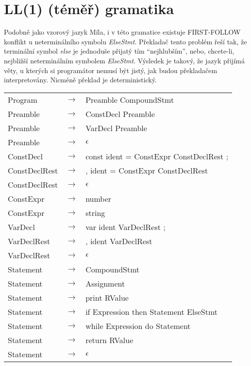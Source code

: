 \documentclass[10pt,a4paper]{article}
\begin{document}
\section{LL(1) (téměř) gramatika}

Podobně jako vzorový jazyk Míla, i v této gramatice existuje FIRST-FOLLOW
konflikt u neterminálního symbolu \textit{ElseStmt}. Překladač tento problém
řeší tak, že terminální symbol \textit{else} je jednoduše přijatý tím
``nejhlubším'', nebo, chcete-li, nejbližší neterminálním symbolem
\textit{ElseStmt}. Výsledek je takový, že jazyk přijímá věty, u kterých si
programátor nemusí být jistý, jak budou překladačem interpretovány. Nicméně
překlad je deterministický.

\begin{longtable}{ l c l }
	Program          & $\rightarrow$ & Preamble CompoundStmt \\
	
	Preamble         & $\rightarrow$ & ConstDecl Preamble \\
	Preamble         & $\rightarrow$ & VarDecl Preamble \\
	Preamble         & $\rightarrow$ & $\epsilon$ \\
	
	ConstDecl        & $\rightarrow$ & const ident = ConstExpr ConstDeclRest ; \\
	
	ConstDeclRest    & $\rightarrow$ & , ident = ConstExpr ConstDeclRest \\
	ConstDeclRest    & $\rightarrow$ & $\epsilon$ \\
	
	ConstExpr        & $\rightarrow$ & number \\
	ConstExpr        & $\rightarrow$ & string \\

	VarDecl          & $\rightarrow$ & var ident VarDeclRest ; \\
	
	VarDeclRest      & $\rightarrow$ & , ident VarDeclRest \\
	VarDeclRest      & $\rightarrow$ & $\epsilon$ \\

	Statement        & $\rightarrow$ & CompoundStmt \\
	Statement        & $\rightarrow$ & Assignment \\
	Statement        & $\rightarrow$ & print RValue \\
	Statement        & $\rightarrow$ & if Expression then Statement ElseStmt \\
	Statement        & $\rightarrow$ & while Expression do Statement \\
	Statement        & $\rightarrow$ & return RValue \\ 
	Statement        & $\rightarrow$ & $\epsilon$ \\


\end{longtable}
\end{document}
